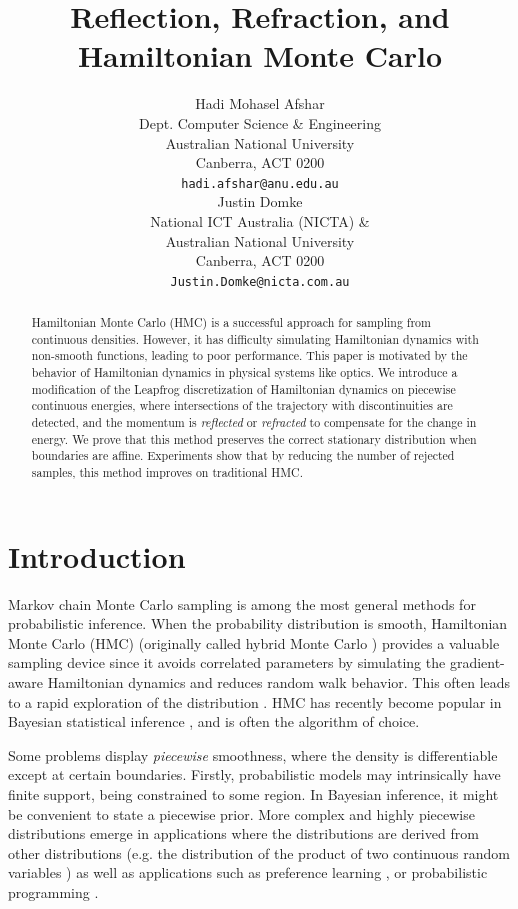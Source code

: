 \documentclass{article} %
\title{Reflection, Refraction, and Hamiltonian Monte Carlo}
\author{
Hadi Mohasel Afshar %
\\
Dept. Computer Science \& Engineering \\
Australian National University\\
Canberra, ACT 0200\\
\texttt{hadi.afshar@anu.edu.au} \\
\And
Justin Domke\\
National ICT Australia (NICTA) \& \\Australian National University\\
Canberra, ACT 0200\\
\texttt{Justin.Domke@nicta.com.au}
}
\begin{document}
\maketitle

\begin{abstract}
Hamiltonian Monte Carlo (HMC) is a successful approach for sampling from continuous densities.  However, it has difficulty simulating Hamiltonian dynamics with non-smooth functions, leading to poor performance.  This paper is motivated by the behavior of Hamiltonian dynamics in physical systems like optics.  We introduce a modification of the Leapfrog discretization of Hamiltonian dynamics on piecewise continuous energies, where intersections of the trajectory with discontinuities are detected, and the momentum is \emph{reflected} or \emph{refracted} to compensate for the change in energy.  We prove that this method preserves the correct stationary distribution when boundaries are affine.  Experiments show that by reducing the number of rejected samples, this method improves on traditional HMC.
\end{abstract}




\section{Introduction}

Markov chain Monte Carlo sampling is among the most general methods for probabilistic inference.  When the probability distribution is smooth, Hamiltonian Monte Carlo (HMC) (originally called hybrid Monte Carlo \cite{duane1987hybrid}) provides a valuable sampling device since it avoids correlated parameters  by simulating the gradient-aware Hamiltonian dynamics and reduces random walk behavior. This often leads to a rapid exploration of the distribution \cite{homan2014no, brooks2011handbook}.  HMC has recently become popular in Bayesian statistical inference \cite{stan-manual:2014}, and is often the algorithm of choice.



Some problems display \emph{piecewise} smoothness, where the density is differentiable except at certain boundaries.  Firstly, probabilistic models may intrinsically have finite support, being constrained to some region.  In Bayesian inference, it might be convenient to state a piecewise prior.  More complex and highly piecewise distributions emerge in applications where the distributions are derived from other distributions (e.g. the distribution of the product of two continuous random variables  \cite{ glen2004computing}) as well as  applications such as preference learning \cite{afshar2015linear}, or probabilistic programming \cite{lunn2009bugs}.
\end{document}
